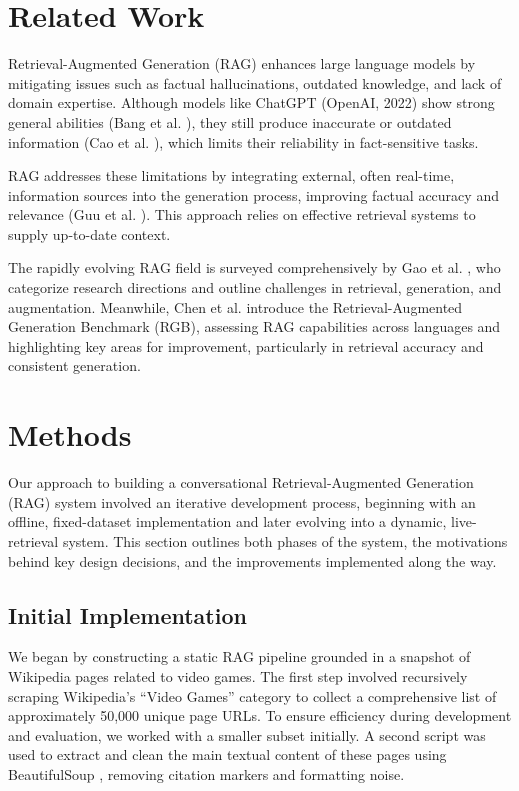 \documentclass[fleqn,moreauthors,10pt]{ds_report}
\begin{document}

\section*{Related Work}

Retrieval-Augmented Generation (RAG) enhances large language models by mitigating issues such as factual hallucinations, outdated knowledge, and lack of domain expertise. Although models like ChatGPT (OpenAI, 2022) show strong general abilities (Bang et al. \cite{bang}), they still produce inaccurate or outdated information (Cao et al. \cite{cao}), which limits their reliability in fact-sensitive tasks.

RAG addresses these limitations by integrating external, often real-time, information sources into the generation process, improving factual accuracy and relevance (Guu et al. \cite{guu}). This approach relies on effective retrieval systems to supply up-to-date context.

The rapidly evolving RAG field is surveyed comprehensively by Gao et al. \cite{gao}, who categorize research directions and outline challenges in retrieval, generation, and augmentation. Meanwhile, Chen et al. \cite{chen} introduce the Retrieval-Augmented Generation Benchmark (RGB), assessing RAG capabilities across languages and highlighting key areas for improvement, particularly in retrieval accuracy and consistent generation.


\section*{Methods}

Our approach to building a conversational Retrieval-Augmented Generation (RAG) system involved an iterative development process, beginning with an offline, fixed-dataset implementation and later evolving into a dynamic, live-retrieval system. This section outlines both phases of the system, the motivations behind key design decisions, and the improvements implemented along the way.

\subsection*{Initial Implementation}

We began by constructing a static RAG pipeline grounded in a snapshot of Wikipedia pages related to video games. The first step involved recursively scraping Wikipedia’s “Video Games” category to collect a comprehensive list of approximately 50,000 unique page URLs. To ensure efficiency during development and evaluation, we worked with a smaller subset initially. A second script was used to extract and clean the main textual content of these pages using BeautifulSoup \cite{soup}, removing citation markers and formatting noise.
\end{document}
